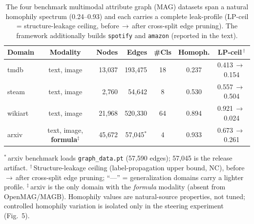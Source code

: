 \begin{table}[t]
\centering
\small
\setlength{\tabcolsep}{6pt}
\renewcommand{\arraystretch}{1.18}
\caption{The four benchmark multimodal attribute graph (MAG) datasets span a natural
homophily spectrum (0.24--0.93) and each carries a complete leak-profile (LP-ceil =
structure-leakage ceiling, before\,$\to$\,after cross-split edge pruning). The framework
additionally builds \texttt{spotify} and \texttt{amazon} (reported in the text).}
\label{tab:dataset_overview}
\begin{tabular}{l c r r c c c}
\toprule
\textbf{Domain} & \textbf{Modality} & \textbf{Nodes} & \textbf{Edges} & \textbf{\#Cls} & \textbf{Homoph.} & \textbf{LP-ceil\,$^{\dagger}$} \\
\midrule
tmdb     & text, image                 & 13{,}037 & 193{,}475 & 18 & 0.237 & 0.413\,$\to$\,0.154 \\
steam    & text, image                 &  2{,}760 &  54{,}642 &  8 & 0.530 & 0.557\,$\to$\,0.504 \\
wikiart  & text, image                 & 21{,}968 & 520{,}330 & 64 & 0.894 & 0.921\,$\to$\,0.024 \\
arxiv    & text, image, \textbf{formula}$^{\ddagger}$ & 45{,}672 & 57{,}045$^{*}$ &  4 & 0.933 & 0.673\,$\to$\,0.261 \\
\bottomrule
\end{tabular}
\vspace{2pt}
\footnotesize
\begin{flushleft}
$^{*}$\,arxiv benchmark loads \texttt{graph\_data.pt} (57{,}590 edges); 57{,}045 is the release artifact.
$^{\dagger}$\,Structure-leakage ceiling (label-propagation upper bound, NC), before\,$\to$\,after cross-split edge pruning; ``---'' = generalization domains carry a lighter profile.
$^{\ddagger}$\,arxiv is the only domain with the \emph{formula} modality (absent from OpenMAG/MAGB). Homophily values are natural-source properties, not tuned; controlled homophily variation is isolated only in the steering experiment (Fig.~5).
\end{flushleft}
\end{table}
